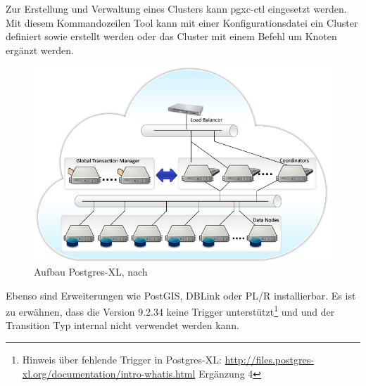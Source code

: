 Zur Erstellung und Verwaltung eines Clusters kann pgxc-ctl eingesetzt werden.
Mit diesem Kommandozeilen Tool kann mit einer Konfigurationsdatei ein Cluster definiert sowie erstellt werden oder das Cluster mit einem Befehl um Knoten ergänzt werden.
\begin{figure}[h!]
\centering
\includegraphics[width=.7\textwidth]{Abbildungen/postgresxl-structure.jpg}
\caption[Aufbau Postgres-XL]{Aufbau Postgres-XL, nach \cite{website:postgresxl-overview}}
\label{fig:postgresxl}
\end{figure}
Ebenso sind Erweiterungen wie PostGIS, DBLink oder PL/R installierbar.
Es ist zu erwähnen, dass die Version 9.2.34 keine Trigger unterstützt\footnote{Hinweis über fehlende Trigger in Postgres-XL: \url{http://files.postgres-xl.org/documentation/intro-whatis.html} Ergänzung 4} und und der Transition Typ internal nicht verwendet werden kann.

